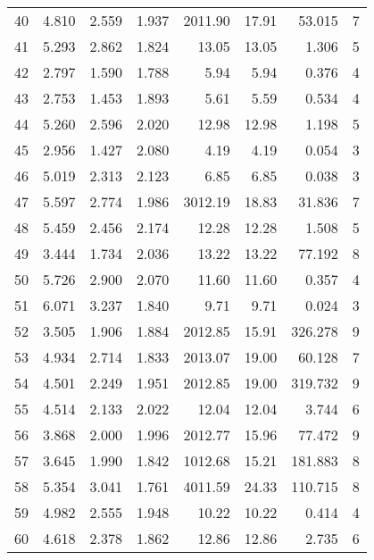 \begin{tabular}{lrrrrrrr}
40 &     4.810 &      2.559 &      1.937 &  2011.90 &    17.91 &   53.015 &        7 \\
41 &     5.293 &      2.862 &      1.824 &    13.05 &    13.05 &    1.306 &        5 \\
42 &     2.797 &      1.590 &      1.788 &     5.94 &     5.94 &    0.376 &        4 \\
43 &     2.753 &      1.453 &      1.893 &     5.61 &     5.59 &    0.534 &        4 \\
44 &     5.260 &      2.596 &      2.020 &    12.98 &    12.98 &    1.198 &        5 \\
45 &     2.956 &      1.427 &      2.080 &     4.19 &     4.19 &    0.054 &        3 \\
46 &     5.019 &      2.313 &      2.123 &     6.85 &     6.85 &    0.038 &        3 \\
47 &     5.597 &      2.774 &      1.986 &  3012.19 &    18.83 &   31.836 &        7 \\
48 &     5.459 &      2.456 &      2.174 &    12.28 &    12.28 &    1.508 &        5 \\
49 &     3.444 &      1.734 &      2.036 &    13.22 &    13.22 &   77.192 &        8 \\
50 &     5.726 &      2.900 &      2.070 &    11.60 &    11.60 &    0.357 &        4 \\
51 &     6.071 &      3.237 &      1.840 &     9.71 &     9.71 &    0.024 &        3 \\
52 &     3.505 &      1.906 &      1.884 &  2012.85 &    15.91 &  326.278 &        9 \\
53 &     4.934 &      2.714 &      1.833 &  2013.07 &    19.00 &   60.128 &        7 \\
54 &     4.501 &      2.249 &      1.951 &  2012.85 &    19.00 &  319.732 &        9 \\
55 &     4.514 &      2.133 &      2.022 &    12.04 &    12.04 &    3.744 &        6 \\
56 &     3.868 &      2.000 &      1.996 &  2012.77 &    15.96 &   77.472 &        9 \\
57 &     3.645 &      1.990 &      1.842 &  1012.68 &    15.21 &  181.883 &        8 \\
58 &     5.354 &      3.041 &      1.761 &  4011.59 &    24.33 &  110.715 &        8 \\
59 &     4.982 &      2.555 &      1.948 &    10.22 &    10.22 &    0.414 &        4 \\
60 &     4.618 &      2.378 &      1.862 &    12.86 &    12.86 &    2.735 &        6 \\

\end{tabular}
